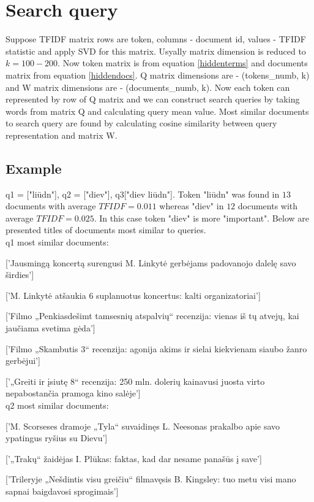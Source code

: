 \documentclass{article}
\begin{document}
\section{Search query}
Suppose TFIDF matrix  rows are token, columns - document id, values - TFIDF statistic and apply SVD for this matrix. Usyally matrix dimension is reduced to $k=100-200$. Now token matrix is from equation \ref{hiddenterms} and documents matrix from equation \ref{hiddendocs}. Q matrix dimensions are - (tokens_numb, k) and W matrix dimensions are - (documents_numb, k). Now each token can represented by row of Q matrix and we can construct search queries by taking words from matrix Q and calculating query mean value. Most similar documents to search query are found by calculating cosine similarity between query representation and matrix W. 

\subsection{Example}
q1 = ["liūdn"], q2 = ["diev"], q3["diev liūdn"]. Token "liūdn" was found in $13$ documents with average $TFIDF =0.011$ whereas "diev" in $12$ documents with average $TFIDF=0.025$. In this case token "diev" is more "important". Below are presented titles of documents most similar to queries.\\

q1 most similar documents:

['Jausmingą koncertą surengusi M. Linkytė gerbėjams padovanojo dalelę savo širdies']

['M. Linkytė atšaukia 6 suplanuotus koncertus: kalti organizatoriai']

['Filmo „Penkiasdešimt tamsesnių atspalvių“ recenzija: vienas iš tų atvejų, kai jaučiama svetima gėda']

['Filmo „Skambutis 3“ recenzija: agonija akims ir sielai kiekvienam siaubo žanro gerbėjui']

['„Greiti ir įsiutę 8“ recenzija: 250 mln. dolerių kainavusi juosta virto nepabostančia pramoga kino salėje']\\

q2 most similar documents:

['M. Scorseses dramoje „Tyla“ suvaidinęs L. Neesonas prakalbo apie savo ypatingus ryšius su Dievu']

['„Trakų“ žaidėjas I. Plūkas: faktas, kad dar nesame panašūs į save']

['Trileryje „Nešdintis visu greičiu“ filmavęsis B. Kingsley: tuo metu visi mano sapnai baigdavosi sprogimais']
\end{document}
